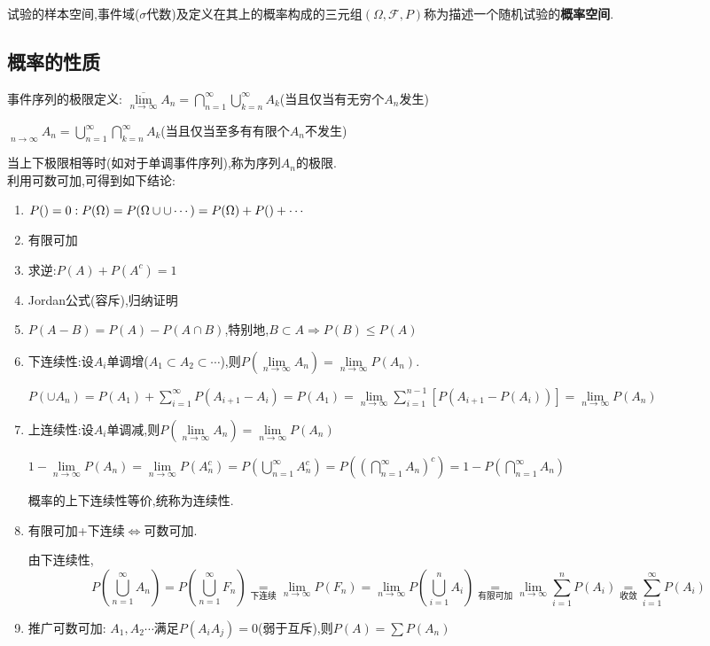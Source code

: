 试验的样本空间,事件域($ \sigma$代数)及定义在其上的概率构成的三元组$ (\Omega,
\mathcal{F}, P)$称为描述一个随机试验的{\bf 概率空间}.
\subsection{概率的性质}

事件序列的极限定义:
$ \overline {\lim \limits_{n \to \infty}}A_n  = \bigcap_{n
=1}^{\infty}\bigcup_{k=n}^{\infty}A_k $(当且仅当有无穷个$ A_n$发生)

$ \mathop{\underline \lim} \limits_{n \to \infty} A_n = \bigcup_{n
=1}^{\infty}\bigcap_{k=n}^{\infty}A_k$(当且仅当至多有有限个$ A_n$不发生)

当上下极限相等时(如对于单调事件序列),称为序列$ A_n$的极限.
\\

利用可数可加,可得到如下结论:
\begin{enumerate}
	\item $ P(\empty) = 0:
		P(\Omega) = P(\Omega \cup \empty \cup \empty \cdots) = P(\Omega) +
		P(\empty) + \cdots$
	\item 有限可加
	\item 求逆:$ P(A) + P(A^c) = 1$
	\item Jordan公式(容斥),归纳证明
	\item $ P(A - B) = P(A) - P(A\cap B)$,特别地,$ B \subset A \Rightarrow
		P(B) \le P(A)$
	\item 下连续性:设$ A_i$单调增($ A_1 \subset A_2 \subset \cdots$),则$
		P(\lim \limits_{n \to \infty }{A_n}) = \lim \limits_{n \to
		\infty}{P(A_n)}$.

		$ P(\cup A_n) = P(A_1) + \sum_{i = 1}^{\infty}{P(A_{i+1} - A_i)} =
		P(A_1) = \lim \limits_{n \to \infty}\sum_{i = 1}^{n-1}{[P(A_{i+1} -
		P(A_i))]} = \lim \limits_{n \to \infty}P(A_n)$

	\item 上连续性:设$ A_i$单调减,则$ P(\lim \limits_{n \to \infty} A_n ) =
		\lim \limits_{n \to \infty} P(A_n)$

		$ 1 - \lim \limits_{n \to \infty}P(A_n) = \lim \limits_{n \to
		\infty}P(A_n^c)=P(\bigcup_{n=1}^{\infty}A_n^c) =
		P((\bigcap_{n=1}^{\infty}A_n)^c) = 1-P(\bigcap_{n=1}^{\infty}A_n)$
	
		概率的上下连续性等价,统称为连续性.

	\item	有限可加+下连续$ \Leftrightarrow $可数可加.

		由下连续性,\[  P(\bigcup_{n=1}^{\infty}A_n) =
		P(\bigcup_{n=1}^{\infty}F_n) \mathop{=}\limits_{\texttt{下连续}}\lim\limits_{n \to \infty}P(F_n)=
		\lim\limits_{n\to\infty}P(\bigcup_{i=1}^nA_i)
		\mathop{=}\limits_{\texttt{有限可加}}
		\lim\limits_{n\to\infty}\sum_{i=1}^n{P(A_i)}\mathop{=} \limits_{\texttt{收敛}}
	\sum_{i=1}^{\infty}P(A_i)\]

\item 推广可数可加:
	$ A_1,A_2\cdots $满足$ P(A_iA_j)=0$(弱于互斥),则$ P(A) = \sum{P(A_n)}$
\end{enumerate}

